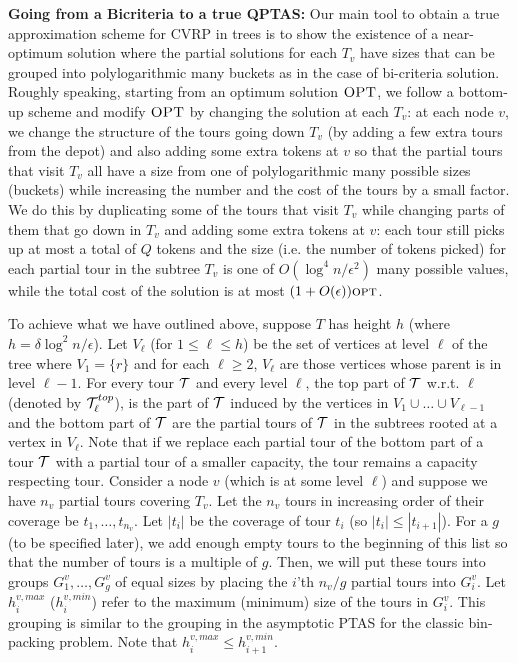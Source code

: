 \documentclass[twoside,leqno]{article}
\newcommand{\calT}{{\cal T}}
\newcommand{\opt}{\mbox{\sc opt}}
\newcommand{\OPT}{\mbox{\sc OPT}}
\newcommand{\eps}{\epsilon}
\begin{document}
\textbf{Going from a Bicriteria to a true QPTAS:}
Our main tool to obtain a true approximation scheme for CVRP in trees is to show the existence of a near-optimum solution where
the partial solutions for each $T_v$ have sizes that can be grouped into polylogarithmic many buckets as in the case of bi-criteria solution.
Roughly speaking, starting from an optimum solution $\OPT$, we follow a bottom-up scheme and modify $\OPT$ by changing the solution at each $T_v$:
at each node $v$, we change the structure of the tours going down $T_v$ (by adding a few extra tours from the depot) and
also adding some extra tokens at $v$ so that the
partial tours that visit $T_v$ all have a size from one of polylogarithmic many possible sizes (buckets)
while increasing the number and the cost of the tours by a small factor. We do this by duplicating some of the tours
that visit $T_v$ while changing parts of them that go down in $T_v$ and adding some extra tokens at $v$:
each tour still picks up at most a total of $Q$ tokens and the size (i.e. the number of tokens picked)
for each partial tour in the subtree $T_v$ is one of $O(\log^4 n/\eps^2)$ many possible values, while the total cost
of the solution is at most $(1+O(\eps))\opt$.

To achieve what we have outlined above, suppose $T$ has height $h$ (where $h=\delta\log^2 n/\epsilon$).
Let $V_\ell$ (for $1\leq \ell \leq h$) be the set of vertices at level
$\ell$ of the tree where $V_1=\{r\}$ and for each $\ell\geq 2$, $V_\ell$ are those vertices whose parent is in level $\ell-1$. For every tour $\calT$ and every level $\ell$, the top part of $\calT$ w.r.t. $\ell$ (denoted by $\calT_\ell^{top}$), is the part of $\calT$ induced by the vertices in $V_1\cup\ldots\cup V_{\ell-1}$ and the bottom part of $\calT$ are the partial tours of $\calT$ in the subtrees rooted at a vertex in $V_\ell$. Note that if we replace each partial tour of
the bottom part of a tour $\calT$ with a partial tour of a smaller capacity, the tour remains a capacity respecting tour.
Consider a node $v$ (which is at some level $\ell$) and suppose we have $n_v$ partial tours covering $T_v$. Let the $n_v$ tours in increasing order of their coverage be $t_{1}, \ldots, t_{n_v}$. Let $|t_i|$ be the coverage of tour $t_i$ (so $|t_i| \le |t_{i+1}|$).
For a $g$ (to be specified later), we add enough empty tours to the beginning of this list so that the number of tours is a multiple of $g$. Then, we will put these tours into groups $G^v_{1}, \ldots, G^v_{g}$ of equal sizes by placing
the $i$'th $ n_v/g $ partial tours into $G^v_i$.
Let $h^{v,max}_i$ ($h^{v,min}_i$) refer to the maximum (minimum) size of the tours in $G^v_{i}$. This grouping is similar to the
grouping in the asymptotic PTAS for the classic bin-packing problem.
Note that $h^{v,max}_{i} \le h^{v,min}_{i+1}$.
\end{document}
